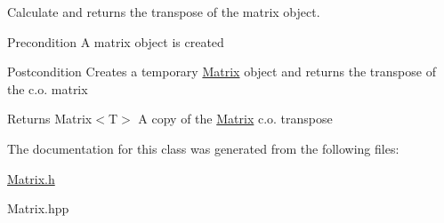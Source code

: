 Calculate and returns the transpose of the matrix object. 

\begin{DoxyPrecond}{Precondition}
A matrix object is created 
\end{DoxyPrecond}
\begin{DoxyPostcond}{Postcondition}
Creates a temporary \mbox{\hyperlink{class_matrix}{Matrix}} object and returns the transpose of the c.\+o. matrix 
\end{DoxyPostcond}
\begin{DoxyReturn}{Returns}
Matrix$<$\+T$>$ A copy of the \mbox{\hyperlink{class_matrix}{Matrix}} c.\+o. transpose 
\end{DoxyReturn}


The documentation for this class was generated from the following files\+:\begin{DoxyCompactItemize}
\item 
\mbox{\hyperlink{_matrix_8h}{Matrix.\+h}}\item 
Matrix.\+hpp\end{DoxyCompactItemize}
